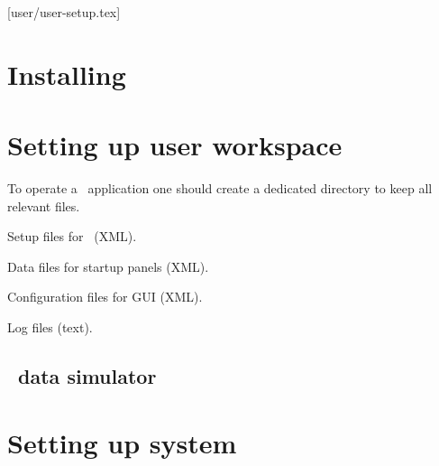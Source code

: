 [user/user-setup.tex]
\section{Installing \dabc}
\section{Setting up user workspace}
To operate a \dabc\ application one should create a dedicated directory
to keep all relevant files.
\bbul
\item Setup files for \dabc\ (XML).
\item Data files for startup panels (XML).
\item Configuration files for GUI (XML).
\item Log files (text).
\ebul
\subsection{\dabc\ data simulator}
\section{Setting up system}
